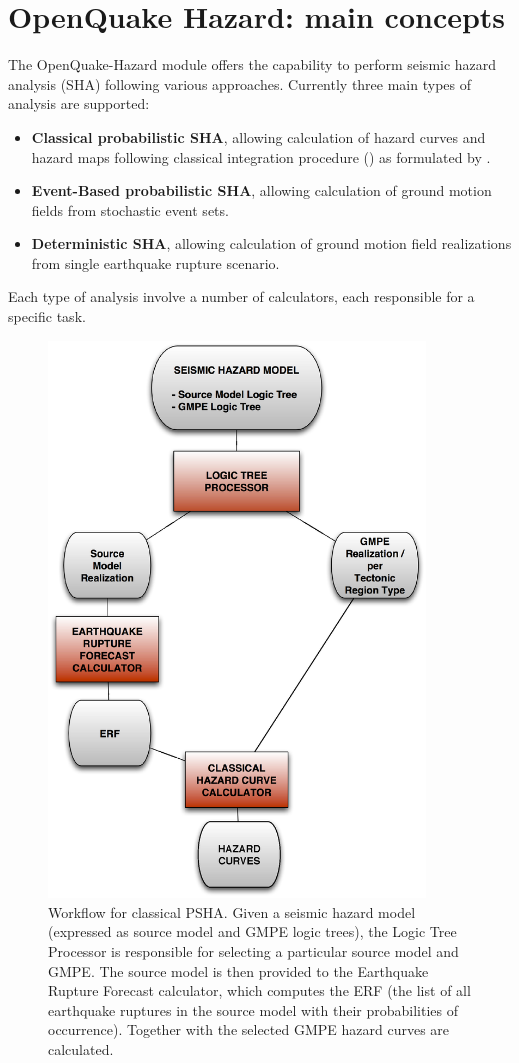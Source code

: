 \section{OpenQuake Hazard: main concepts}
The OpenQuake-Hazard module offers the capability to perform seismic hazard analysis (SHA) following various approaches. Currently three main types of analysis are supported:
\begin{itemize}
\item \textbf{Classical probabilistic SHA}, allowing calculation of hazard curves and hazard maps  following classical integration procedure (\cite{cornell1968}) as formulated by \cite{field2003}.
\item \textbf{Event-Based probabilistic SHA}, allowing calculation of ground motion fields from stochastic event sets.
\item \textbf{Deterministic SHA}, allowing calculation of ground motion field realizations from single  earthquake rupture scenario.
\end{itemize}
Each type of analysis involve a number of calculators, each responsible for a specific task.
\begin{figure}[htbp]
\begin{center}
\includegraphics[width=10cm]{./Figures/Part_Hazard/classical_psha_workflow.eps}
\caption{Workflow for classical PSHA. Given a seismic hazard model (expressed as source model and GMPE logic trees), the Logic Tree Processor is responsible for selecting a particular source model and GMPE. The source model is then provided to the Earthquake Rupture Forecast calculator, which computes the ERF (the list of all earthquake ruptures in the source model with their probabilities of occurrence). Together with the selected GMPE hazard curves are calculated.}
\label{classical_psha_workflow}
\end{center}
\end{figure}
